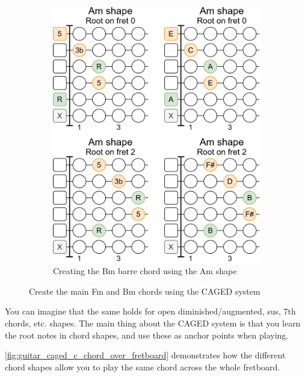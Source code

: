 \begin{figure}[h]
	\hfill
	\begin{subfigure}{0.37\textwidth}
		\includegraphics[width=\textwidth]{../../Images/CagedAmShapeToBmChord.png}
		\caption{Creating the Bm barre chord using the Am shape}
		\label{fig:guitar_caged_am_shape_to_bm}
	\end{subfigure}
	\label{fig:guitar_caged_create_main_fm_bm_barre_chords}
	\caption{Create the main Fm and Bm chords using the CAGED system}
\end{figure}

You can imagine that the same holds for open diminished/augmented, sus, 7th chords, etc. shapes. The main thing about the CAGED system is that you learn the root notes in chord shapes, and use these as anchor points when playing.

\newpage

\autoref{fig:guitar_caged_c_chord_over_fretboard} demonstrates how the different chord shapes allow you to play the same chord across the whole fretboard.


